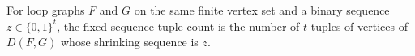 \begin{definition}
For loop graphs \(F\) and \(G\) on the same finite vertex set and a binary sequence \(z\in\{0,1\}^t\), the fixed-sequence tuple count is the number of \(t\)-tuples of vertices of \(D(F,G)\) whose shrinking sequence is \(z\).
\end{definition}
